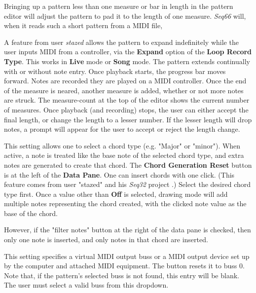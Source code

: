    Bringing up a pattern less than one measure or bar in
   length in the pattern editor will adjust the pattern to pad it to the
   length of one measure.
   \textsl{Seq66} will, when it reads such a short pattern
   from a MIDI file,

   A feature from user \textsl{stazed} allows the pattern to expand
   indefinitely while the user inputs MIDI from a controller, via the
   \textbf{Expand} option of the \textbf{Loop Record Type}.
   This works in \textbf{Live} mode or \textbf{Song} mode.
   The pattern extends continually with or without note entry.
   Once playback starts, the progress bar moves forward.
   Notes are recorded they are played on a MIDI controller.
   Once the end of the measure is neared, another
   measure is added, whether or not more notes are struck.
   The measure-count at the top of the editor shows the current number
   of measures.
   Once playback (and recording) stops, the user can either accept the
   final length, or change the length to a lesser number.
   If the lesser length will drop notes, a prompt will appear
   for the user to accept or reject the length change.

   This setting allows one to select a chord type (e.g. "Major" or "minor").
   When active, a note is treated like the base note of the selected chord
   type, and extra notes are generated to create that chord.
   The \textbf{Chord Generation Reset} button is at the left of the
   \textbf{Data Pane}.
   One can insert chords with one click.
   (This feature comes from user "stazed"
   and his \textsl{Seq32} project \cite{seq32}.)
   Select the desired chord type first.
   Once a value other than \textbf{Off} is selected,
   drawing mode will add multiple notes representing the chord
   created, with the clicked note value as the base of the chord.

   However, if the "filter notes" button at the right of the
   data pane is checked, then only one note is inserted, and
   only notes in that chord are inserted.

   This setting specifies a virtual MIDI output buss or a
   MIDI output device set up by the computer and
   attached MIDI equipment.
   The button resets it to buss 0.
   Note that, if the pattern's selected buss is not found, this entry will be
   blank.  The user must select a valid buss from this dropdown.

